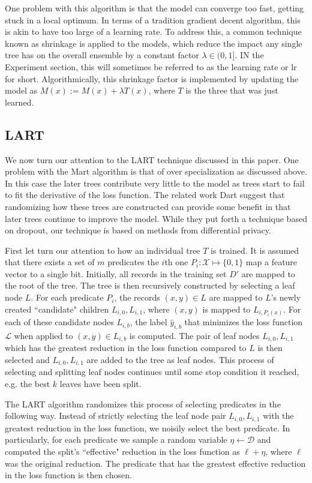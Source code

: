 \documentclass{article} %
\begin{document}
One problem with this algorithm is that the model can converge too fast, getting stuck in a local optimum. In terms of a tradition gradient decent algorithm, this is akin to have too large of a learning rate. To address this, a common technique known as shrinkage is applied to the models, which reduce the impact any single tree has on the overall ensemble by a constant factor $\lambda\in (0,1]$. IN the Experiment section, this will sometimes be referred to as the learning rate or lr for short. Algorithmically,  this shrinkage factor is implemented by updating the model as $M(x):= M(x) + \lambda T(x)$, where $T$ is the three that was just learned.


\subsection{LART}
We now turn our attention to the LART technique discussed in this paper. One problem with the Mart algorithm is that of over specialization as discussed above\cite{dart}. In this case the later trees contribute very little to the  model as trees start to fail to fit the derivative of the loss function. The related work Dart \cite{dart} suggest that randomizing how these trees are constructed can provide some benefit in that later trees continue to improve the model. While they put forth a technique based on dropout, our technique is based on methods from differential privacy.


First let turn our attention to how an individual tree $T$ is trained. It is assumed that there exists a set of $m$ predicates the $i$th one $P_i:\mathcal{X} \mapsto \{0,1\}$ map a feature vector to a single bit.  Initially, all records in the training set $D'$ are mapped to the root of the tree. The tree is then recursively constructed by selecting a leaf node $L$. For each predicate $P_i$, the records $(x,y)\in L$ are mapped to $L$'s newly created ``candidate" children $L_{i,0},L_{i,1}$, where $(x,y)$ is mapped to $L_{i,P_i(x)}$. For each of these candidate nodes $L_{i,b}$, the label $\hat{y}_{i,b}$ that minimizes the loss function $\mathcal{L}$ when applied to $(x,y)\in L_{i,b}$ is computed. The pair of leaf nodes $L_{i,0}, L_{i,1}$ which has the greatest reduction in the loss function compared to $L$ is then selected and $L_{i,0}, L_{i,1}$ are added to the tree as leaf nodes. This process of selecting and splitting leaf nodes continues until some stop condition it reached, e.g. the best $k$ leaves have been split.

The LART algorithm randomizes this process of selecting predicates in the following way. Instead of strictly selecting the leaf node pair $L_{i,0}, L_{i,1}$ with the greatest reduction in the loss function, we noisily select the best predicate. In particularly, for each predicate we sample a random variable $\eta\gets \mathcal{D}$ and computed the split's ``effective" reduction in the loss function as $\ell + \eta$, where $\ell$ was the original reduction. The predicate that has the greatest effective reduction in the loss function is then chosen.
\end{document}
